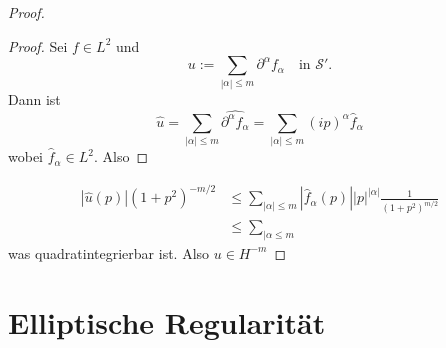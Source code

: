\documentclass[
paper=a4,
bibtotocnumbered,
liststotocnumbered,
tablecaptionabove,
pointlessnumbers,
twoside,
openright,
10pt
]
{report}
\theoremstyle{definition}
\numberwithin{equation}{chapter}
\begin{document}
\begin{proof}
\begin{proof}
Sei $f\in L^2$ und
\begin{equation}
u:= \sum_{|\alpha|\le m} \partial^\alpha f_\alpha \quad \text{in } \mathcal S'.
\end{equation}
Dann ist
\begin{equation}
\hat u= \sum_{|\alpha|\le m} \widehat{\partial^\alpha f_\alpha} = \sum_{|\alpha|\le m} (ip)^\alpha \hat f_\alpha
\end{equation}
wobei $\hat f_\alpha\in L^2$. Also 
\end{proof}
\begin{align}
|\hat u(p)| (1+p^2)^{-m/2} &\le \sum_{|\alpha|\le m} |\hat f_\alpha (p)| |p|^{|\alpha|} \frac{1}{(1+p^2)^{m/2}} \\
&\le \sum_{|\alpha\le m} 
\end{align}
was quadratintegrierbar ist. Also $u\in H^{-m}$
\end{proof}
\section{Elliptische Regularität}
\end{document}

